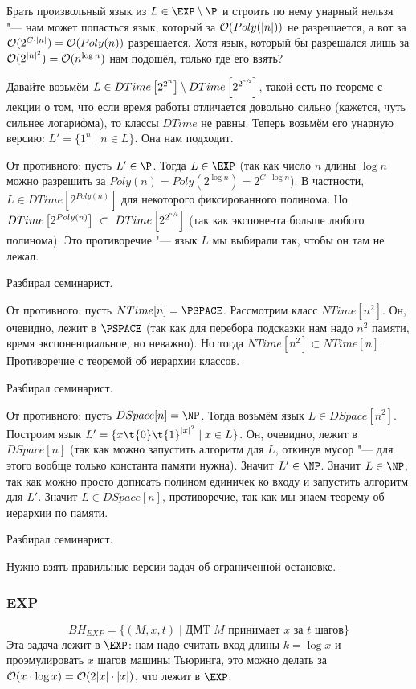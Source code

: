 		\begin{Rem}
			Брать произвольный язык из $L \in \EXP \setminus \P$ и строить по нему унарный
			нельзя "--- нам может попасться язык, который за $\mathcal O(Poly(|n|))$ не разрешается, а вот
			за $\mathcal O(2^{C\cdot|n|})=\mathcal O(Poly(n))$ разрешается.
			Хотя язык, который бы разрешался лишь за $\mathcal O(2^{|n|^2}) = \mathcal O(n^{\log n})$ нам подошёл, только где его взять?
		\end{Rem}

		Давайте возьмём $L \in DTime\left[2^{2^n}\right] \setminus DTime\left[2^{2^{\sfrac n2}}\right]$,
		такой есть по теореме с лекции о том, что если время работы отличается довольно
		сильно (кажется, чуть сильнее логарифма), то классы $DTime$ не равны.
		Теперь возьмём его унарную версию: $L' = \{ 1^n \mid n \in L\}$.
		Она нам подходит.

		От противного: пусть $L' \in \P$.
		Тогда $L \in \EXP$ (так как число $n$ длины $\log n$ можно разрешить за $Poly(n)=Poly(2^{\log n})=2^{C\cdot \log n}$).
		В частности, $L \in DTime\left[2^{Poly(n)}\right]$ для некоторого фиксированного полинома.
		Но $DTime\left[2^{Poly(n)}\right]~\subset~DTime\left[2^{2^{\sfrac n2}}\right]$ (так как экспонента больше любого полинома).
		Это противоречие "--- язык $L$ мы выбирали так, чтобы он там не лежал.

	Разбирал семинарист.

	От противного: пусть $NTime[n] = \PSPACE$.
	Рассмотрим класс $NTime[n^2]$.
	Он, очевидно, лежит в $\PSPACE$ (так как для перебора подсказки нам надо $n^2$
	памяти, время экспоненциальное, но неважно).
	Но тогда $NTime[n^2] \subset NTime[n]$.
	Противоречие с теоремой об иерархии классов.

	Разбирал семинарист.

	От противного: пусть $DSpace[n] = \NP$.
	Тогда возьмём язык $L \in DSpace[n^2]$.
	Построим язык $L' = \{ x\t{0}\t{1}^{|x|^2} \mid x \in L \}$.
	Он, очевидно, лежит в $DSpace[n]$ (так как можно запустить алгоритм для $L$, откинув мусор "--- для этого
	вообще только константа памяти нужна).
	Значит $L' \in \NP$.
	Значит $L \in \NP$, так как можно просто дописать полином единичек ко входу и запустить алгоритм для $L'$.
	Значит $L \in DSpace[n]$, противоречие, так как мы знаем теорему об иерархии по памяти.

	Разбирал семинарист.

	Нужно взять правильные версии задач об ограниченной остановке.

	\subsubsection{EXP}
		\[ BH_{EXP} = \{ (M, x, t) \mid \text{ДМТ $M$ принимает $x$ за $t$ шагов} \} \]
		Эта задача лежит в $\EXP$: нам надо считать вход длины $k=\log x$ и проэмулировать
		$x$ шагов машины Тьюринга, это можно делать за $\mathcal O(x \cdot \log x)=\mathcal O(2{|x|}\cdot |x|)$, что лежит
		в $\EXP$.

